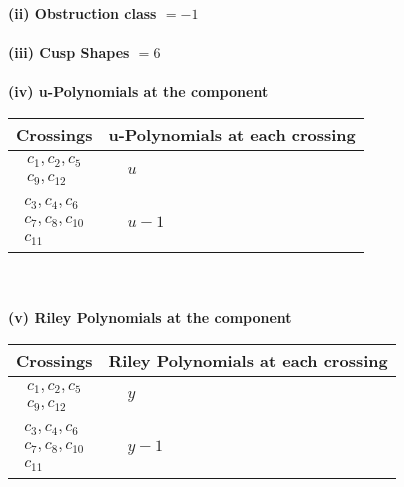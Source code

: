 \documentclass[1p]{elsarticle_modified}
\theoremstyle{definition}
\begin{document}
\flushleft \textbf{(ii) Obstruction class $= -1$}\\~\\
\flushleft \textbf{(iii) Cusp Shapes $= 6$}\\~\\
\newpage\renewcommand{\arraystretch}{1}
\flushleft \textbf{(iv) u-Polynomials at the component}\newline \\
\begin{tabular}{m{50pt}|m{274pt}}
Crossings & \hspace{64pt}u-Polynomials at each crossing \\
\hline $$\begin{aligned}c_{1},c_{2},c_{5}\\c_{9},c_{12}\end{aligned}$$&$\begin{aligned}
&u
\end{aligned}$\\
\hline $$\begin{aligned}c_{3},c_{4},c_{6}\\c_{7},c_{8},c_{10}\\c_{11}\end{aligned}$$&$\begin{aligned}
&u-1
\end{aligned}$\\
\hline
\end{tabular}\\~\\
\newpage\renewcommand{\arraystretch}{1}
\flushleft \textbf{(v) Riley Polynomials at the component}\newline \\
\begin{tabular}{m{50pt}|m{274pt}}
Crossings & \hspace{64pt}Riley Polynomials at each crossing \\
\hline $$\begin{aligned}c_{1},c_{2},c_{5}\\c_{9},c_{12}\end{aligned}$$&$\begin{aligned}
&y
\end{aligned}$\\
\hline $$\begin{aligned}c_{3},c_{4},c_{6}\\c_{7},c_{8},c_{10}\\c_{11}\end{aligned}$$&$\begin{aligned}
&y-1
\end{aligned}$\\
\hline
\end{tabular}\\~\\
\end{document}
